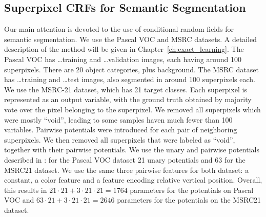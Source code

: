 \subsection{Superpixel CRFs for Semantic Segmentation}
Our main attention is devoted to the use of conditional random fields for
semantic segmentation.  We use the Pascal VOC and MSRC datasets. A detailed
description of the method will be given in Chapter~\ref{ch:exact_learning}.
The Pascal VOC has \ldots training and \ldots validation images, each having
around 100 superpixels. There are 20 object categories, plus background. The %
MSRC dataset has \ldots training and \ldots test images, also segmented in
around 100 superpixels each. We use the MSRC-21 dataset, which has 21 target
classes.
Each superpixel is represented as an output variable, with the ground truth obtained
by majority vote over the pixel belonging to the superpixel. We removed all
superpixels which were mostly ``void'', leading to some samples haven much
fewer than 100 variables.
Pairwise potentials were introduced for each pair of neighboring superpixels.
We then removed all superpixels that were labeled as ``void'', together with
their pairwise potentials.
We use the unary and pairwise potentials described in :
for the Pascal VOC dataset 21 unary potentials and 63 for the MSRC21 dataset.
We use the same three pairwise features for both dataset: a constant, a color
feature and a feature encoding relative vertical position.
Overall, this results in $21 \cdot  21 + 3 \cdot 21 \cdot 21 = 1764$ parameters
for the potentials on Pascal VOC and $63 \cdot  21 + 3 \cdot 21 \cdot 21 =
2646$ parameters for the potentials on the MSRC21 dataset.


